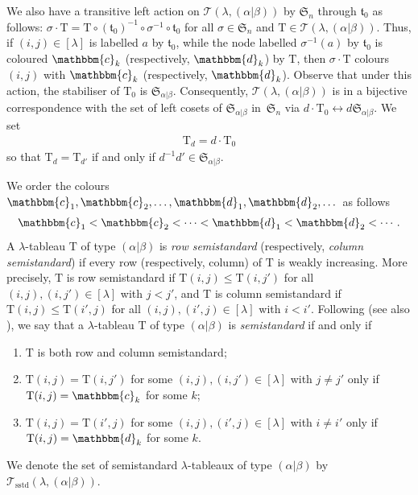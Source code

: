 \documentclass[pdftex]{sigma}
\renewcommand{\t}{\mathfrak{t}}
\newcommand{\TT}{\mathscr{T}}
\newcommand{\TTS}{\mathscr{T}_\mathrm{sstd}}
\newcommand{\T}{\mathrm{T}}
\newcommand{\sym}[1]{\mathfrak{S}_{#1}}
\newcommand{\bb}[1]{\mathbbm{{#1}}}
\begin{document}
We also have a transitive left action on $\TT(\lambda, (\alpha|\beta))$ by $\sym{n}$ through $\t_0$ as follows: $\sigma \cdot \T = \T \circ (\t_0)^{-1} \circ \sigma^{-1} \circ \t_0$ for all $\sigma \in \sym{n}$ and $\T \in \TT(\lambda,(\alpha|\beta))$. Thus, if $(i,j) \in [\lambda]$ is labelled $a$ by $\t_0$, while the node labelled $\sigma^{-1}(a)$ by $\t_0$ is coloured $\bb{c}_k$ (respectively, $\bb{d}_k$) by $\T$, then $\sigma \cdot \T$ colours $(i,j)$ with $\bb{c}_k$ (respectively, $\bb{d}_k$). Observe that under this action, the stabiliser of $\T_0$ is $\sym{\alpha|\beta}$. Consequently, $\TT(\lambda, (\alpha|\beta))$ is in a bijective correspondence with the set of left cosets of $\sym{\alpha|\beta}$ in~$\sym{n}$ via $d \cdot \T_0 \leftrightarrow d \sym{\alpha|\beta}$. We set \begin{gather*}\T_d=d\cdot \T_0\end{gather*} so that $\T_d=\T_{d'}$ if and only if $d^{-1}d'\in\sym{\alpha|\beta}$.

We order the colours $\bb{c}_1,\bb{c}_2,\dotsc,\bb{d}_1,\bb{d}_2,\dotsc$ as follows
\begin{gather*}\bb{c}_1<\bb{c}_2<\cdots<\bb{d}_1<\bb{d}_2<\cdots.\end{gather*} A $\lambda$-tableau $\T$ of type $(\alpha|\beta)$ is {\em row semistandard} (respectively, {\em column semistandard}) if every row (respectively, column) of $\T$ is weakly increasing. More precisely, $\T$ is row semistandard if $\T(i,j) \leq \T(i, j')$ for all $(i,j), (i,j') \in [\lambda]$ with $j < j'$, and $\T$ is column semistandard if $\T(i,j) \leq \T(i', j)$ for all $(i,j), (i',j) \in [\lambda]$ with $i < i'$. Following \cite[Section~1.2]{Se} (see also \cite[Section~4]{DR}), we say that
a $\lambda$-tableau $\T$ of type $(\alpha|\beta)$ is {\em semistandard} if and only if
\begin{enumerate}\itemsep=0pt
\item [(i)] $\T$ is both row and column semistandard;
\item [(ii)] $\T(i,j) = \T(i,j')$ for some $(i,j),(i,j') \in [\lambda]$ with $j\ne j'$ only if $\T(i,j) = \bb{c}_k$ for some $k$;
\item [(iii)] $\T(i,j) = \T(i',j)$ for some $(i,j),(i',j) \in [\lambda]$ with $i\ne i'$ only if $\T(i,j) = \bb{d}_k$ for some $k$.
\end{enumerate}
We denote the set of semistandard $\lambda$-tableaux of type $(\alpha|\beta)$ by $\TTS(\lambda, (\alpha|\beta))$.

\end{document}
